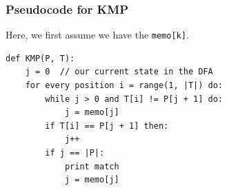 \documentclass[10pt]{article}
\begin{document}
\subsubsection*{Pseudocode for KMP}
Here, we first assume we have the \texttt{memo[k]}.
\begin{verbatim}
def KMP(P, T):
    j = 0  // our current state in the DFA
    for every position i = range(1, |T|) do:
        while j > 0 and T[i] != P[j + 1] do:
            j = memo[j]
        if T[i] == P[j + 1] then:
            j++
        if j == |P|:
            print match
            j = memo[j]
\end{verbatim}
\end{document}
